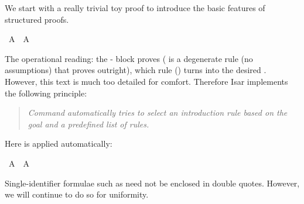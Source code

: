 %
\begin{isabellebody}%
\def\isabellecontext{Logic}%
\isamarkupfalse%
%
\isamarkuptrue%
%
\isamarkuptrue%
%
\isamarkuptrue%
%
\begin{isamarkuptext}%
We start with a really trivial toy proof to introduce the basic
features of structured proofs.%
\end{isamarkuptext}%
\isamarkuptrue%
\ {\isachardoublequote}A\ {\isasymlongrightarrow}\ A{\isachardoublequote}\isanewline
\isamarkupfalse%
\isamarkupfalse%
\isamarkupfalse%
\isamarkupfalse%
\isamarkupfalse%
\isamarkupfalse%
%
\begin{isamarkuptext}%
\noindent
The operational reading: the -
block proves  ( is a degenerate rule (no
assumptions) that proves  outright), which rule
 () turns into the desired .  However, this text is much too detailed for comfort. Therefore
Isar implements the following principle: \begin{quote}\em Command
 automatically tries to select an introduction rule
based on the goal and a predefined list of rules.  \end{quote} Here
 is applied automatically:%
\end{isamarkuptext}%
\isamarkuptrue%
\ {\isachardoublequote}A\ {\isasymlongrightarrow}\ A{\isachardoublequote}\isanewline
\isamarkupfalse%
\isamarkupfalse%
\isamarkupfalse%
\isamarkupfalse%
\isamarkupfalse%
\isamarkupfalse%
%
\begin{isamarkuptext}%
\noindent Single-identifier formulae such as  need not
be enclosed in double quotes. However, we will continue to do so for
uniformity.


\end{isamarkuptext}
\end{isabellebody}
